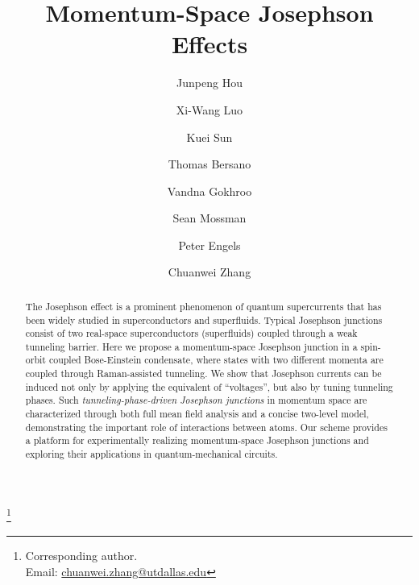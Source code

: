 \documentclass[twocolumn,prl,floatfix,citeautoscript,nofootinbib,superscriptaddress]{revtex4}
\begin{document}
\author{Junpeng Hou}
\author{Xi-Wang Luo}
\author{Kuei Sun}
\author{Thomas Bersano}
\author{Vandna Gokhroo}
\author{Sean Mossman}
\author{Peter Engels}
\author{Chuanwei Zhang}
\thanks{Corresponding author. \\
Email: \href{mailto:chuanwei.zhang@utdallas.edu}{chuanwei.zhang@utdallas.edu}%
}
\title{Momentum-Space Josephson Effects}

\begin{abstract}
The Josephson effect is a prominent phenomenon of quantum supercurrents that
has been widely studied in superconductors and superfluids. Typical
Josephson junctions consist of two real-space superconductors (superfluids)
coupled through a weak tunneling barrier. Here we propose a momentum-space
Josephson junction in a spin-orbit coupled Bose-Einstein condensate, where
states with two different momenta are coupled through Raman-assisted
tunneling. We show that Josephson currents can be induced not only by
applying the equivalent of ``voltages'', but also by tuning tunneling
phases. Such \textit{tunneling-phase-driven Josephson junctions} in momentum
space are characterized through both full mean field analysis and a concise
two-level model, demonstrating the important role of interactions between
atoms. Our scheme provides a platform for experimentally realizing
momentum-space Josephson junctions and exploring their applications in
quantum-mechanical circuits.
\end{abstract}

\maketitle
\end{document}
